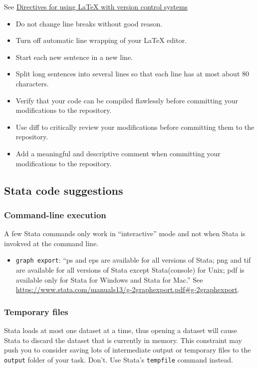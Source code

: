 See \href{https://en.wikibooks.org/wiki/LaTeX/Collaborative_Writing_of_LaTeX_Documents\#Subversion_really_makes_the_difference}{Directives for using LaTeX with version control systems}
\begin{itemize}
\item Do not change line breaks without good reason.
\item Turn off automatic line wrapping of your LaTeX editor.
\item Start each new sentence in a new line.
\item Split long sentences into several lines so that each line has at most about 80 characters.
\item Verify that your code can be compiled flawlessly before committing your modifications to the repository.
\item Use diff to critically review your modifications before committing them to the repository.
\item Add a meaningful and descriptive comment when committing your modifications to the repository.
\end{itemize}

\subsection{Stata code suggestions}

\subsubsection{Command-line execution}

A few Stata commands only work in ``interactive'' mode and not when Stata is invokved at the command line.
\begin{itemize}
	\item \texttt{graph export}: 
	``ps and eps are available for all versions of Stata; png and tif are available for all versions of Stata except Stata(console) for Unix; pdf is available only for Stata for Windows and Stata for Mac.''
	See \url{https://www.stata.com/manuals13/g-2graphexport.pdf#g-2graphexport}.
\end{itemize}


\subsubsection{Temporary files}
Stata loads at most one dataset at a time, 
thus opening a dataset will cause Stata to discard the dataset that is currently in memory.
This constraint may push you to consider saving lots of intermediate output or temporary files to the \texttt{output} folder of your task.
Don't.
Use Stata's \texttt{tempfile} command instead.

